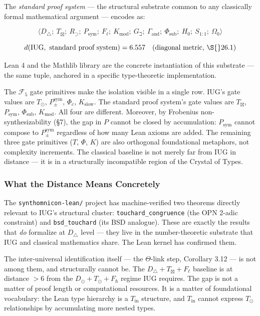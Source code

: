 \documentclass[10pt,a4paper]{article}
\newcommand{\pilcrow}{\S}
\begin{document}
The \emph{standard proof system} --- the structural substrate common to any classically formal mathematical argument --- encodes as:

{\small\[\langle D_{\triangle};\ T_{\boxtimes};\ R_{\supset};\ P_\text{sym};\ F_{\ell};\ K_\text{mod};\ G_{\beth};\ \Gamma_\text{and};\ \Phi_\text{sub};\ H_0;\ S_{1:1};\ \Omega_0 \rangle\]}

\[d(\text{IUG},\ \text{standard proof system}) = 6.557 \quad \text{(diagonal metric, \pilcrow{}26.1)}\]

Lean 4 and the Mathlib library are the concrete instantiation of this substrate ---
the same tuple, anchored in a specific type-theoretic implementation.

The $\mathcal{F}_5$ gate primitives make the isolation visible in a single row.
IUG's gate values are $T_\odot$, $P_{\pm}^{\text{sym}}$, $\Phi_c$, $K_\text{slow}$.
The standard proof system's gate values are $T_{\boxtimes}$, $P_\text{sym}$, $\Phi_\text{sub}$, $K_\text{mod}$.
All four are different.
Moreover, by Frobenius non-synthesizability (\S7), the gap in $P$ cannot be closed by
accumulation: $P_\text{sym}$ cannot compose to $P_{\pm}^{\text{sym}}$ regardless of how
many Lean axioms are added.
The remaining three gate primitives ($T$, $\Phi$, $K$) are also orthogonal foundational
metaphors, not complexity increments.
The classical baseline is not merely far from IUG in distance --- it is in a structurally
incompatible region of the Crystal of Types.

\subsubsection{What the Distance Means Concretely}

The \texttt{synthomnicon-lean/} project has machine-verified two theorems directly relevant to
IUG's structural cluster: \texttt{touchard\_congruence} (the OPN 2-adic constraint) and
\texttt{bsd\_touchard} (its BSD analogue). These are exactly the results that \emph{do} formalize at
$D_{\triangle}$ level --- they live in the number-theoretic substrate that IUG and classical
mathematics share. The Lean kernel has confirmed them.

The inter-universal identification itself --- the $\Theta$-link step, Corollary 3.12 --- is
not among them, and structurally cannot be. The $D_{\triangle} + T_{\boxtimes} + F_{\ell}$
baseline is at distance $> 6$ from the $D_\odot + T_\odot + F_{\hbar}$ regime
IUG requires. The gap is not a matter of proof length or computational resources. It is a
matter of foundational vocabulary: the Lean type hierarchy is a $T_\text{in}$
structure, and $T_\text{in}$ cannot express $T_\odot$ relationships by
accumulating more nested types.
\end{document}
